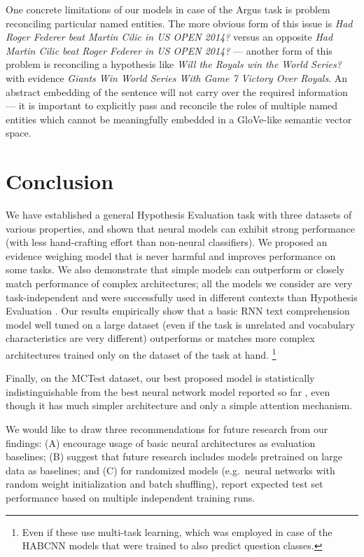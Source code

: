 \documentclass[11pt]{article}
\begin{document}

One concrete limitations of our models in case of the Argus task
is problem reconciling particular named entities.
The more obvious form of this issue is \textit{Had Roger Federer beat Martin Cilic in US OPEN 2014?}
versus an opposite \textit{Had Martin Cilic beat Roger Federer in US OPEN 2014?} ---
another form of this problem is reconciling a hypothesis like
\textit{Will the Royals win the World Series?}
with evidence
\textit{Giants Win World Series With Game 7 Victory Over Royals}.
An abstract embedding of the sentence will not carry over the required
information --- it is important to explicitly pass and reconcile the roles
of multiple named entities which cannot be meaningfully embedded in a GloVe-like
semantic vector space.


\section{Conclusion}
\label{sec:concl}

We have established a general Hypothesis Evaluation task with three datasets
of various properties, and shown that neural models can exhibit strong
performance (with less hand-crafting effort than non-neural classifiers).
We proposed an evidence weighing model that is never harmful and improves
performance on some tasks.
We also demonstrate that simple models can outperform or closely match
performance of complex architectures;
all the models we consider are very task-independent and were successfully
used in different contexts than Hypothesis Evaluation \cite{sps}.
Our results empirically show that a basic RNN text comprehension model
well tuned on a large dataset (even if the task is unrelated and vocabulary
characteristics are very different) outperforms or matches more complex
architectures trained only on the dataset of the task at hand.%
\footnote{Even if these use multi-task learning, which was employed in case
of the HABCNN models that were trained to also predict question classes.}

Finally, on the MCTest dataset, our best proposed model is statistically
indistinguishable from the best neural network model reported so far
\cite{HABCNN},
even though it has much simpler architecture and only a simple attention
mechanism.

We would like to draw three recommendations for future research from our findings:
(A) encourage usage of basic neural architectures as evaluation baselines;
(B) suggest that future research includes models pretrained on large data as
baselines; and
(C) for randomized models (e.g.\ neural networks with random weight
initialization and batch shuffling), report expected test set performance
based on multiple independent training runs.
\end{document}
